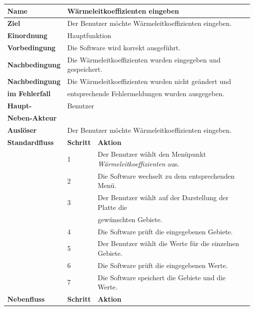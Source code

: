 \begin{table} [H]
	\centering
	\begin{tabular}{|l|l|l|}
		\hline
		\textbf{Name} 			& \multicolumn{2}{|l|}{Wärmeleitkoeffizienten eingeben}  \\
		\hline
		\textbf{Ziel} 			& \multicolumn{2}{|l|}{Der Benutzer möchte Wärmeleitkoeffizienten eingeben. }\\ 
		\hline
		\textbf{Einordnung}		& \multicolumn{2}{|l|}{Hauptfunktion}\\
		\hline
		\textbf{Vorbedingung}	& \multicolumn{2}{|l|}{Die Software wird korrekt ausgeführt.} \\
		\hline
		\textbf{Nachbedingung}	& \multicolumn{2}{|l|}{Die Wärmeleitkoeffizienten wurden eingegeben und gespeichert.}\\
		\hline
		\textbf{Nachbedingung} 	& \multicolumn{2}{|l|}{Die Wärmeleitkoeffizienten wurden nicht geändert und}\\
		\textbf{im Fehlerfall}	& \multicolumn{2}{|l|}{entsprechende Fehlermeldungen wurden ausgegeben.}\\
		\hline
		\textbf{Haupt-} 			& \multicolumn{2}{|l|}{Benutzer}\\
		\textbf{Neben-Akteur}	& \multicolumn{2}{|l|}{	}			\\
		\hline
		\textbf{Auslöser} 		& \multicolumn{2}{|l|}{Der Benutzer möchte Wärmeleitkoeffizienten eingeben.} \\
		\hline 
		\textbf{Standardfluss} & \textbf{Schritt} & \textbf{Aktion} \\
		\hline
		&	1	& Der Benutzer wählt den Menüpunkt \emph{Wärmeleitkoeffizienten} aus. \\
		\cline{2-3}
		&	2	& Die Software wechselt zu dem entsprechenden Menü.\\
		\cline{2-3}
		&	3	& Der Benutzer wählt auf der Darstellung der Platte die \\
		&       & gewünschten Gebiete.\\
		\cline{2-3}
		&	4	& Die Software prüft die eingegebenen Gebiete.\\
		\cline{2-3}
		&	5	& Der Benutzer wählt die Werte für die einzelnen Gebiete.\\
		\cline{2-3}
		&	6	& Die Software prüft die eingegebenen Werte.\\
		\cline{2-3}
		&	7	& Die Software speichert die Gebiete und die Werte.\\
		\hline
		\textbf{Nebenfluss} & \textbf{Schritt} & \textbf{Aktion}\\

\end{tabular}
\end{table}
